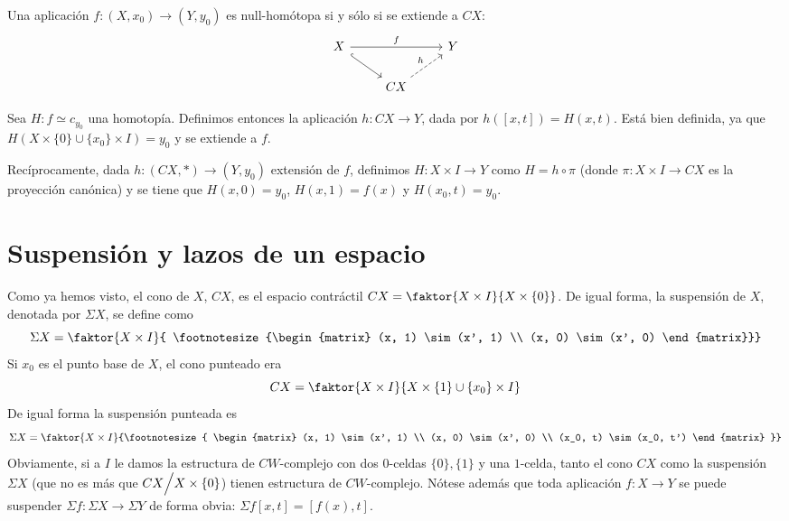 \begin{teor}
Una aplicación $f : (X, x_0) \longrightarrow (Y, y_0)$ es null-homótopa si y sólo si se extiende a $CX$: 
$$
\begin{tikzcd}
	X \arrow{rr}{f} \drar[hook] & & Y \\
	& CX \urar[dashed]{h} & 
\end{tikzcd}
$$
\end{teor}
\begin{demo}
Sea $H : f \simeq c_{y_0}$ una homotopía. Definimos entonces la aplicación $h : CX \longrightarrow Y$, dada por $h([x, t]) = H(x, t)$. Está bien definida, ya que $H(X \times \{ 0 \} \cup \{ x_0 \} \times I) = y_0$ y se extiende a $f$.\par 
Recíprocamente, dada $h : (CX, \ast) \longrightarrow (Y, y_0)$ extensión de $f$, definimos $H: X \times I \longrightarrow Y$ como $H = h \circ \pi$ (donde $\pi: X \times I \longrightarrow CX$ es la proyección canónica) y se tiene que 
$H(x, 0) = y_0$, $H(x, 1) = f(x)$ y $H(x_0, t) = y_0$.
\end{demo}

\section{Suspensión y lazos de un espacio}

Como ya hemos visto, el cono de $X$, $CX$, es el espacio contráctil $CX = \faktor{X \times I }{X \times \{ 0 \}}$. De igual forma, la suspensión de $X$, denotada por $\Sigma X$, se define como
\[ \Sigma X =  \faktor{X \times I}
{ \footnotesize{\begin{matrix}
(x, 1) \sim (x', 1) \\
(x, 0) \sim (x', 0)
\end{matrix}}} \] 
Si $x_0$ es el punto base de $X$, el cono punteado era
\[ CX = \faktor{X \times I}{X \times \{ 1 \}  \cup \{ x_0 \} \times I}\]
De igual forma la suspensión punteada es 
\[ \Sigma X = \faktor{ X \times I }
{\footnotesize{ \begin{matrix}
(x, 1) \sim (x', 1) \\ 
(x, 0) \sim (x', 0) \\ 
(x_0, t) \sim (x_0, t')
\end{matrix} }} \]
Obviamente, si a $I$ le damos la estructura de $CW$-complejo con dos $0$-celdas $\{0\}, \{1\}$ y una $1$-celda, tanto el cono $CX$ como la suspensión $\Sigma X$ (que no es más que $CX \Bign/ X \times \{ 0 \}$) tienen estructura de $CW$-complejo. Nótese además que toda aplicación $f : X \rightarrow Y$ se puede suspender $\Sigma f : \Sigma X \rightarrow \Sigma Y$ de forma obvia:
$\Sigma f [x, t] = [f(x), t]$. \par

